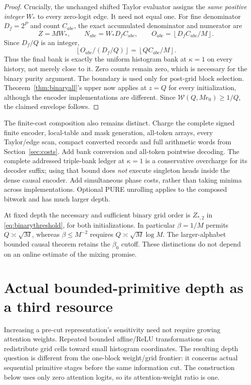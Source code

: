 \documentclass[11pt,letterpaper]{article}
\theoremstyle{definition}\newtheorem{definition}[theorem]{Definition}
\theoremstyle{remark}\newtheorem{remark}[theorem]{Remark}
\newcommand{\floor}[1]{\left\lfloor #1\right\rfloor}
\begin{document}
\begin{proof}
Crucially, the unchanged shifted Taylor evaluator assigns the \emph{same positive integer} $W_*$ to every zero-logit edge. It need not equal one. For fine denominator $D_f=2^P$ and count $C_{abc}$, the exact accumulated denominator and numerator are
\[
 Z=MW_*,\qquad N_{abc}=W_*D_fC_{abc},\qquad
 O_{abc}=\floor{D_fC_{abc}/M}.
\]
Since $D_f/Q$ is an integer,
\[
 \floor{O_{abc}/(D_f/Q)}=\floor{QC_{abc}/M}.
\]
Thus the final bank is exactly the uniform histogram bank at $\kappa=1$ on every history, not merely close to it. Zero counts remain zero, which is necessary for the binary purity argument. The boundary is used only for post-grid block selection. Theorem~\ref{thm:binaryall}'s upper now applies at $z=Q$ for every initialization, although the encoder implementations are different. Since $\mathcal W(Q,Me_0)\ge1/Q$, the claimed envelope follows.
\end{proof}

The finite-cost composition also remains distinct. Charge the complete signed finite encoder, local-table and mask generation, all-token arrays, every Taylor/edge scan, compact converted records and full arithmetic words from Section~\ref{sec:costs}. Add bank conversion and all-token pointwise decoding. The complete addressed triple-bank ledger at $\kappa=1$ is a conservative overcharge for its decoder suffix; using that bound does \emph{not} execute singleton heads inside the dense causal encoder. Add simultaneous phase costs, rather than taking minima across implementations. Optional PURE unrolling applies to the composed bitwork and has much larger depth.

At fixed depth the necessary and sufficient binary grid order is $Z_{*,2}$ in \eqref{eq:binarythreshold}, for both initializations. In particular $\beta=1/M$ permits $Q\asymp\sqrt M$, whereas $\beta\le M^{-2}$ requires $Q\asymp\sqrt M\log M$. The larger-alphabet bounded causal theorem retains the $\beta_0$ cutoff. These distinctions do not depend on an online estimate of the mixing promise.

\section{Actual bounded-primitive depth as a third resource}\label{sec:depth}
Increasing a pre-cut representation's sensitivity need not require growing attention weights. Repeated bounded affine/ReLU transformations can redistribute grid cells toward small histogram coordinates. The resulting depth question is different from the one-block weight/grid frontier: it concerns actual sequential primitive stages before the same information cut. The construction below uses only zero attention logits, so its attention-weight ratio is one.
\end{document}
